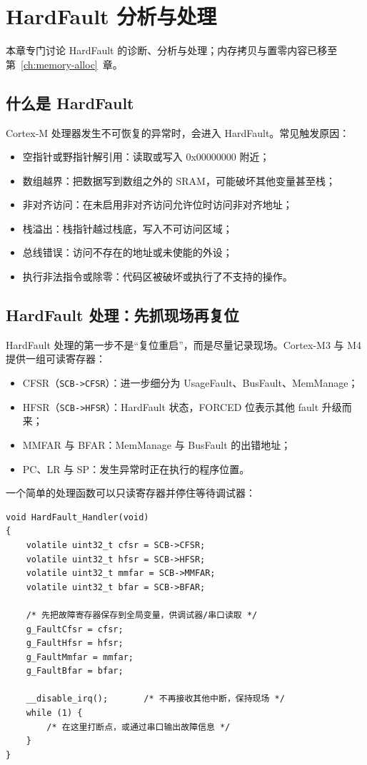 \chapter{HardFault 分析与处理} \label{ch:hardfault}

本章专门讨论 HardFault 的诊断、分析与处理；内存拷贝与置零内容已移至第~\ref{ch:memory-alloc}~章。

\section{什么是 HardFault}

Cortex-M 处理器发生不可恢复的异常时，会进入 HardFault。常见触发原因：

\begin{itemize}
\item 空指针或野指针解引用：读取或写入 0x00000000 附近；
\item 数组越界：把数据写到数组之外的 SRAM，可能破坏其他变量甚至栈；
\item 非对齐访问：在未启用非对齐访问允许位时访问非对齐地址；
\item 栈溢出：栈指针越过栈底，写入不可访问区域；
\item 总线错误：访问不存在的地址或未使能的外设；
\item 执行非法指令或除零：代码区被破坏或执行了不支持的操作。
\end{itemize}

\section{HardFault 处理：先抓现场再复位}

HardFault 处理的第一步不是“复位重启”，而是尽量记录现场。Cortex-M3 与 M4 提供一组可读寄存器：

\begin{itemize}
\item CFSR（\texttt{SCB->CFSR}）：进一步细分为 UsageFault、BusFault、MemManage；
\item HFSR（\texttt{SCB->HFSR}）：HardFault 状态，FORCED 位表示其他 fault 升级而来；
\item MMFAR 与 BFAR：MemManage 与 BusFault 的出错地址；
\item PC、LR 与 SP：发生异常时正在执行的程序位置。
\end{itemize}

一个简单的处理函数可以只读寄存器并停住等待调试器：

\begin{lstlisting}[style=c]
void HardFault_Handler(void)
{
    volatile uint32_t cfsr = SCB->CFSR;
    volatile uint32_t hfsr = SCB->HFSR;
    volatile uint32_t mmfar = SCB->MMFAR;
    volatile uint32_t bfar = SCB->BFAR;

    /* 先把故障寄存器保存到全局变量，供调试器/串口读取 */
    g_FaultCfsr = cfsr;
    g_FaultHfsr = hfsr;
    g_FaultMmfar = mmfar;
    g_FaultBfar = bfar;

    __disable_irq();       /* 不再接收其他中断，保持现场 */
    while (1) {
        /* 在这里打断点，或通过串口输出故障信息 */
    }
}
\end{lstlisting}

